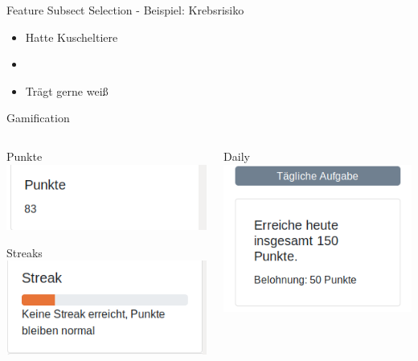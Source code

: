 \documentclass[xcolor=dvipsnames]{beamer}
\begin{document}
    \begin{frame}{Feature Subsect Selection - Beispiel: Krebsrisiko}
        \begin{itemize}
            \item Hatte Kuscheltiere
            \item {}
            \item Trägt gerne weiß
        \end{itemize}
    \end{frame}
    \begin{frame}{Gamification}
         \begin{columns}
            \begin{column}{0.5\textwidth}
                \begin{block}{Punkte}
                    \center
                    \includegraphics[width=(\textwidth / 2)]{img/points.png}
                \end{block}
                \begin{block}{Streaks}
                    \center
                    \includegraphics[width=(\textwidth / 2)]{img/streak.png}
                \end{block}
            \end{column}
            \begin{column}{0.5\textwidth}
                \begin{block}{Daily}
                    \center
                    \includegraphics[width=(\textwidth / 2)]{img/daily.png}
                \end{block}
            \end{column}
        \end{columns}


\end{frame}
\end{document}
